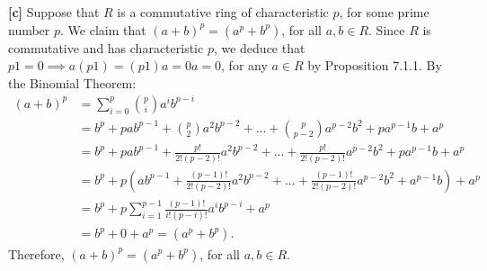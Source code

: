 \vspace{3 mm}

\textbf{[c]} Suppose that $R$ is a commutative ring of characteristic $p$, for some prime number $p$. We claim that $(a + b)^p = (a^p + b^p)$, for all $a,b \in R$. Since $R$ is commutative and has characteristic $p$, we deduce that $p1 = 0 \implies a(p1) = (p1)a = 0a = 0$, for any $a \in R$ by Proposition 7.1.1. By the Binomial Theorem:
\begin{align*}
    (a + b)^p &= \sum_{i=0}^p {p \choose i} a^ib^{p-i} \\
    &= b^p + pab^{p-1} + {p \choose 2}a^2b^{p-2} + ... + {p \choose p-2}a^{p-2}b^2 + pa^{p-1}b + a^p \\
    &= b^p + pab^{p-1} + \frac{p!}{2!(p-2)!}a^2b^{p-2} + ... + \frac{p!}{2!(p-2)!}a^{p-2}b^2 + pa^{p-1}b + a^p \\
    &= b^p + p(ab^{p-1} + \frac{(p-1)!}{2!(p-2)!}a^2b^{p-2} + ... + \frac{(p-1)!}{2!(p-2)!}a^{p-2}b^2 + a^{p-1}b) + a^p \\
    &= b^p + p\sum_{i=1}^{p-1}\frac{(p-1)!}{i!(p-i)!}a^ib^{p-i} + a^p \\
    &= b^p + 0 + a^p = (a^p + b^p).
\end{align*}
Therefore, $(a + b)^p = (a^p + b^p)$, for all $a,b \in R$.